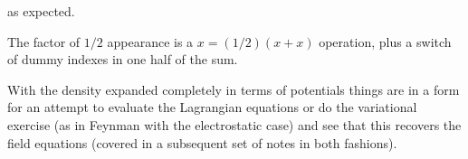 \documentclass{article}
\begin{document}
as expected.

The factor of $1/2$ appearance is a $x = (1/2)(x + x)$ operation, plus a switch of dummy indexes in one half of the sum.

With the density expanded completely in terms of potentials things are in a form for an attempt to 
evaluate the Lagrangian equations or do the 
variational exercise (as in Feynman 
\cite{feynman1963flp}
with the electrostatic case) and see that this recovers the field equations (covered in a subsequent set of notes in both fashions).



\end{document}
